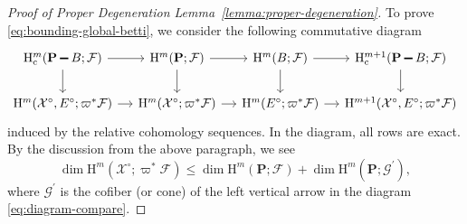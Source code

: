 \documentclass[english]{smfart}
\renewcommand{\setminus}{\mathbin{\rule[0.2em]{0.67em}{0.12em}}}%
\renewcommand{\mathbb}{\mathbf}
\renewcommand{\leq}{\leqslant}
\theoremstyle{remark}
\theoremstyle{plain}
\theoremstyle{definition}
\numberwithin{equation}{remark}
\theoremstyle{void}
\begin{document}
\begin{proof}[Proof of Proper Degeneration Lemma~\ref{lemma:proper-degeneration}]
To prove \eqref{eq:bounding-global-betti}, we consider the following
commutative diagram
\begin{equation*}
\begin{tikzcd}[column sep=small]
\mathrm{H}^m_{\mathrm{c}}(\mathbb{P}\setminus B;\mathcal{F}) \ar[r]\ar[d] & \mathrm{H}^m(\mathbb{P};\mathcal{F}) \ar[r] \ar[d] &
\mathrm{H}^m(B;\mathcal{F}) \ar[d]  \ar[r] &\mathrm{H}^{m+1}_{\mathrm{c}}(\mathbb{P}\setminus B;\mathcal{F}) \ar[d]  \\
\mathrm{H}^m(\mathcal{X}^{\circ},E^{\circ};\varpi^{\ast}\mathcal{F}) \ar[r] & \mathrm{H}^m(\mathcal{X}^{\circ};\varpi^{\ast}\mathcal{F})  \ar[r]
& \mathrm{H}^m(E^{\circ};\varpi^{\ast}\mathcal{F})  \ar[r] &  \mathrm{H}^{m+1}(\mathcal{X}^{\circ},E^{\circ};\varpi^{\ast}\mathcal{F})
\end{tikzcd}
\end{equation*}
induced by the relative cohomology sequences.  In the diagram, all
rows are exact.  By the discussion from the above paragraph, we see
\[
\dim \mathrm{H}^{m}(\mathcal{X}^{\circ};\varpi^{\ast}\mathcal{F})
\leq \dim \mathrm{H}^{m}(\mathbb{P};\mathcal{F})+
\dim \mathrm{H}^{m}(\mathbb{P};\mathcal{G}^{\prime}),
\]
where \(\mathcal{G}^{\prime}\) is the cofiber (or cone) of the left
vertical arrow in the diagram \eqref{eq:diagram-compare}.


\end{proof}
\end{document}

